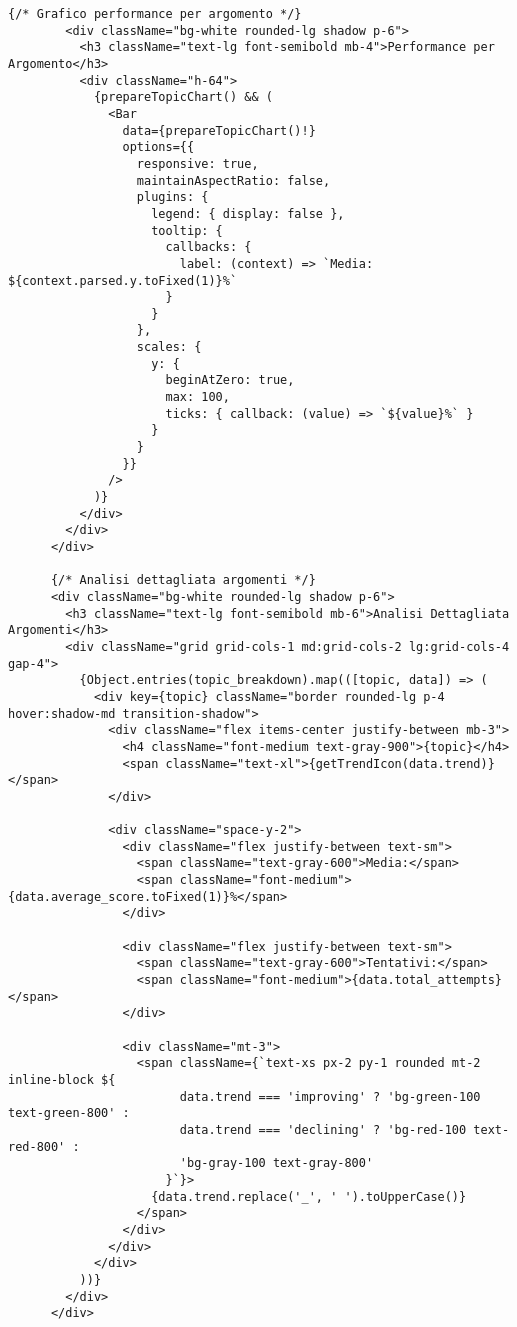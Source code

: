 \documentclass[a4paper, 14pt, oneside]{extbook}
\begin{document}
\begin{lstlisting}[style=javascriptstyle, caption=Dashboard Intelligente con Analytics Avanzate, label=lst:dashboard-component]
        {/* Grafico performance per argomento */}
        <div className="bg-white rounded-lg shadow p-6">
          <h3 className="text-lg font-semibold mb-4">Performance per Argomento</h3>
          <div className="h-64">
            {prepareTopicChart() && (
              <Bar
                data={prepareTopicChart()!}
                options={{
                  responsive: true,
                  maintainAspectRatio: false,
                  plugins: {
                    legend: { display: false },
                    tooltip: {
                      callbacks: {
                        label: (context) => `Media: ${context.parsed.y.toFixed(1)}%`
                      }
                    }
                  },
                  scales: {
                    y: {
                      beginAtZero: true,
                      max: 100,
                      ticks: { callback: (value) => `${value}%` }
                    }
                  }
                }}
              />
            )}
          </div>
        </div>
      </div>

      {/* Analisi dettagliata argomenti */}
      <div className="bg-white rounded-lg shadow p-6">
        <h3 className="text-lg font-semibold mb-6">Analisi Dettagliata Argomenti</h3>
        <div className="grid grid-cols-1 md:grid-cols-2 lg:grid-cols-4 gap-4">
          {Object.entries(topic_breakdown).map(([topic, data]) => (
            <div key={topic} className="border rounded-lg p-4 hover:shadow-md transition-shadow">
              <div className="flex items-center justify-between mb-3">
                <h4 className="font-medium text-gray-900">{topic}</h4>
                <span className="text-xl">{getTrendIcon(data.trend)}</span>
              </div>
              
              <div className="space-y-2">
                <div className="flex justify-between text-sm">
                  <span className="text-gray-600">Media:</span>
                  <span className="font-medium">{data.average_score.toFixed(1)}%</span>
                </div>
                
                <div className="flex justify-between text-sm">
                  <span className="text-gray-600">Tentativi:</span>
                  <span className="font-medium">{data.total_attempts}</span>
                </div>
                
                <div className="mt-3">
                  <span className={`text-xs px-2 py-1 rounded mt-2 inline-block ${
                        data.trend === 'improving' ? 'bg-green-100 text-green-800' :
                        data.trend === 'declining' ? 'bg-red-100 text-red-800' :
                        'bg-gray-100 text-gray-800'
                      }`}>
                    {data.trend.replace('_', ' ').toUpperCase()}
                  </span>
                </div>
              </div>
            </div>
          ))}
        </div>
      </div>


\end{lstlisting}
\end{document}

